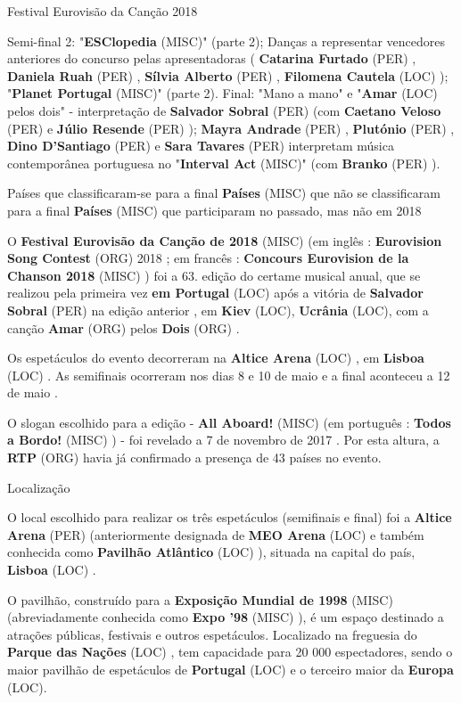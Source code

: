\documentclass[12pt,a4paper]{article}
\begin{document}
Festival Eurovisão da Canção 2018



Semi-final 2: "\textbf{ESClopedia} (MISC)" (parte 2); Danças a representar vencedores anteriores do concurso pelas apresentadoras ( \textbf{Catarina Furtado} (PER) , \textbf{Daniela Ruah} (PER) , \textbf{Sílvia Alberto} (PER) , \textbf{Filomena Cautela} (LOC) ); "\textbf{Planet Portugal} (MISC)" (parte 2). Final: "Mano a mano" e "\textbf{Amar} (LOC) pelos dois" - interpretação de \textbf{Salvador Sobral} (PER) (com \textbf{Caetano Veloso} (PER) e \textbf{Júlio Resende} (PER) ); \textbf{Mayra Andrade} (PER) , \textbf{Plutónio} (PER) , \textbf{Dino D'Santiago} (PER) e \textbf{Sara Tavares} (PER) interpretam música contemporânea portuguesa no "\textbf{Interval Act} (MISC)" (com \textbf{Branko} (PER) ).

Países que classificaram-se para a final \textbf{Países} (MISC) que não se classificaram para a final \textbf{Países} (MISC) que participaram no passado, mas não em 2018

O \textbf{Festival Eurovisão da Canção de 2018} (MISC) (em inglês : \textbf{Eurovision Song Contest} (ORG) 2018 ; em francês : \textbf{Concours Eurovision de la Chanson 2018} (MISC) ) foi a 63. edição do certame musical anual, que se realizou pela primeira vez \textbf{em Portugal} (LOC) após a vitória de \textbf{Salvador Sobral} (PER) na edição anterior , em \textbf{Kiev} (LOC), \textbf{Ucrânia} (LOC), com a canção \textbf{Amar} (ORG) pelos \textbf{Dois} (ORG) .

Os espetáculos do evento decorreram na \textbf{Altice Arena} (LOC) , em \textbf{Lisboa} (LOC) . As semifinais ocorreram nos dias 8 e 10 de maio e a final aconteceu a 12 de maio .

O slogan escolhido para a edição - \textbf{All Aboard!} (MISC) (em português : \textbf{Todos a Bordo!} (MISC) ) - foi revelado a 7 de novembro de 2017 . Por esta altura, a \textbf{RTP} (ORG) havia já confirmado a presença de 43 países no evento.



Localização

O local escolhido para realizar os três espetáculos (semifinais e final) foi a \textbf{Altice Arena} (PER) (anteriormente designada de \textbf{MEO Arena} (LOC) e também conhecida como \textbf{Pavilhão Atlântico} (LOC) ), situada na capital do país, \textbf{Lisboa} (LOC) .

O pavilhão, construído para a \textbf{Exposição Mundial de 1998} (MISC) (abreviadamente conhecida como \textbf{Expo '98} (MISC) ), é um espaço destinado a atrações públicas, festivais e outros espetáculos. Localizado na freguesia do \textbf{Parque das Nações} (LOC) , tem capacidade para 20 000 espectadores, sendo o maior pavilhão de espetáculos de \textbf{Portugal} (LOC) e o terceiro maior da \textbf{Europa} (LOC).
\end{document}
